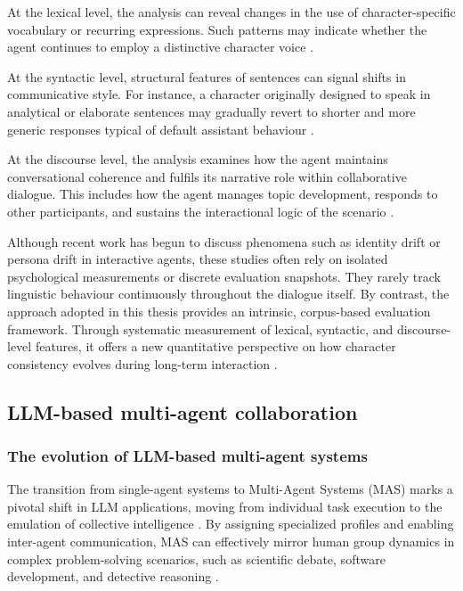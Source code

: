 \documentclass{article}
\begin{document}
At the lexical level, the analysis can reveal changes in the use of character-specific vocabulary or recurring expressions. Such patterns may indicate whether the agent continues to employ a distinctive character voice \citep{zhou2023characterglm, wang2024rolellm}.

At the syntactic level, structural features of sentences can signal shifts in communicative style. For instance, a character originally designed to speak in analytical or elaborate sentences may gradually revert to shorter and more generic responses typical of default assistant behaviour \citep{park2023generative, wang2024rolellm}.

At the discourse level, the analysis examines how the agent maintains conversational coherence and fulfils its narrative role within collaborative dialogue. This includes how the agent manages topic development, responds to other participants, and sustains the interactional logic of the scenario \citep{ji2025enhancing}.

Although recent work has begun to discuss phenomena such as identity drift or persona drift in interactive agents, these studies often rely on isolated psychological measurements or discrete evaluation snapshots. They rarely track linguistic behaviour continuously throughout the dialogue itself. By contrast, the approach adopted in this thesis provides an intrinsic, corpus-based evaluation framework. Through systematic measurement of lexical, syntactic, and discourse-level features, it offers a new quantitative perspective on how character consistency evolves during long-term interaction \citep{choi2024examining}.

\subsection{LLM-based multi-agent collaboration}

\subsubsection{The evolution of LLM-based multi-agent systems}

The transition from single-agent systems to Multi-Agent Systems (MAS) marks a pivotal shift in LLM applications, moving from individual task execution to the emulation of collective intelligence \citep{guo2024review, xi2025review}. By assigning specialized profiles and enabling inter-agent communication, MAS can effectively mirror human group dynamics in complex problem-solving scenarios, such as scientific debate, software development, and detective reasoning \citep{guo2024review}.
\end{document}
